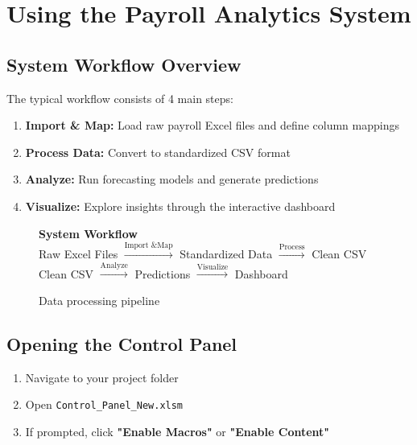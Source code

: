 \documentclass[11pt,a4paper]{article}
\begin{document}
\newpage

\section{Using the Payroll Analytics System}

\subsection{System Workflow Overview}

The typical workflow consists of 4 main steps:

\begin{enumerate}[leftmargin=*]
    \item \textbf{Import \& Map:} Load raw payroll Excel files and define column mappings
    \item \textbf{Process Data:} Convert to standardized CSV format
    \item \textbf{Analyze:} Run forecasting models and generate predictions
    \item \textbf{Visualize:} Explore insights through the interactive dashboard
\end{enumerate}

\begin{figure}[h]
\centering
\begin{tcolorbox}[width=0.9\textwidth, colback=white, colframe=primaryblue]
\centering
\textbf{System Workflow}\\[0.5cm]
Raw Excel Files $\xrightarrow{\text{Import \& Map}}$ Standardized Data $\xrightarrow{\text{Process}}$ Clean CSV\\[0.3cm]
Clean CSV $\xrightarrow{\text{Analyze}}$ Predictions $\xrightarrow{\text{Visualize}}$ Dashboard
\end{tcolorbox}
\caption{Data processing pipeline}
\end{figure}

\subsection{Opening the Control Panel}

\begin{enumerate}[leftmargin=*]
    \item Navigate to your project folder
    \item Open \texttt{Control\_Panel\_New.xlsm}
    \item If prompted, click \textbf{"Enable Macros"} or \textbf{"Enable Content"}
\end{enumerate}
\end{document}
